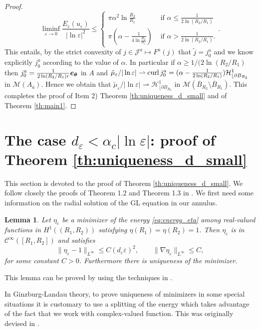 \documentclass[12pt,reqno]{amsart}
\newtheorem{lemma}[theorem]{Lemma}
\def\C{{\mathcal C}}
\def\M{{\mathcal M}}
\def\e {{\varepsilon}}
\renewcommand{\vec}[1]{\text{\boldmath $#1$}}
\def\curl{{\rm curl\,}}
\def \p {\partial}
\def \J {{\mathcal J}}
\numberwithin{equation}{section}
\begin{document}
\begin{proof}
\[  \liminf_{\e \to 0} \frac{E_\e(u_\e)}{|\ln \e|^2}\leq \begin{cases}
\pi \alpha^2 \ln \frac{R_2}{R_1}  & \text{ if } \alpha \leq \frac{1}{2 \ln (R_2/R_1)} \\
 \pi \left(\alpha-\frac{1}{4\ln \frac{R_2}{R_1}}\right)  & \text{ if } \alpha > \frac{1}{2 \ln (R_2/R_1)}.
\end{cases} .\]
This entails, by the strict convexity of \(j \in \J^a \mapsto F^a(j)\) that \( \tilde{j}=j_0^a\) and we know explicitly \(j_0^a\) according to the value of \(\alpha\). In particular if \(\alpha \geq 1/(2\ln (R_2/R_1)\) then \(j_0^a=\frac{1}{2\ln (R_2/R_1) r}\vec{e_\theta}\) in \(A\) and \(\tilde{\mu}_\e/|\ln \e|\rightharpoonup \curl j_0^a =(\alpha-\frac{1}{2\ln (R_2/R_1)})\mathcal{H}^1_{\lfloor \p B_{R_2}}\) in \(\mathcal{M}(A_a)\). Hence we obtain that \(\tilde{\mu}_\e/|\ln \e|\rightharpoonup \mathcal{H}^1_{\lfloor \p B_{R_2}}\) in \(\M(\overline{B}_{R_2}\setminus \overline{B}_{R_1})\). This completes the proof of Item 2) Theorem \ref{th:uniqueness_d_small} and of Theorem \ref{th:main1}.
\end{proof}

\section{The case \(d_\e < \alpha_c|\ln \e|\): proof of Theorem \ref{th:uniqueness_d_small}}\label{sec:d_small}
This section is devoted to the proof of Theorem \ref{th:uniqueness_d_small}. We follow closely the proofs of Theorem 1.2 and Theorem 1.3 in \cite{Aftalion_Jerrard_RoyoLetelier_2011}. We first need some information on the radial solution of the GL equation in our annulus.

\begin{lemma}\label{lem:estimates_eta}
Let \(\eta_\e\) be a minimizer of the energy \eqref{eq:energy_eta} among real-valued functions in \(H^1((R_1,R_2))\) satisfying \(\eta(R_1)=\eta(R_2)=1\). Then \(\eta_\e\) is in \(\C^\infty([R_1,R_2])\) and satisfies
\begin{equation}\label{eq:estimate_eta}
\|\eta_\e-1\|_{L^\infty}\leq C(d_\e\e)^2, \quad \quad \| \nabla \eta_\e\|_{L^\infty}\leq C,
\end{equation}
for some constant \(C>0\). Furthermore there is uniqueness of the minimizer.
\end{lemma}
This lemma can be proved by using the techniques in \cite{BBH_93,Aftalion_2006}.

In Ginzburg-Landau theory, to prove uniqueness of minimizers in some special situations  it is customary to use a splitting of the energy which takes advantage of the  fact that we work with complex-valued function. This was originally devised in \cite{Lassoued_Mironescu_1999}. 
\end{document}
